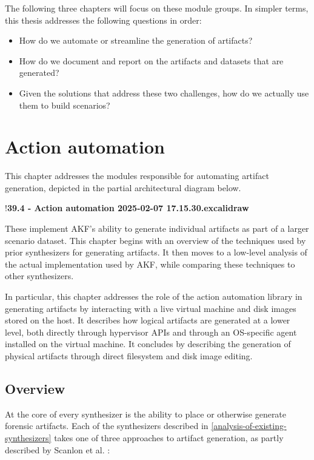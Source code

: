 \documentclass[letterpaper,12pt]{report}
\def\tightlist{}
\begin{document}
The following three chapters will focus on these module groups. In
simpler terms, this thesis addresses the following questions in order:

\begin{itemize}
\tightlist
\item
  How do we automate or streamline the generation of artifacts?
\item
  How do we document and report on the artifacts and datasets that are
  generated?
\item
  Given the solutions that address these two challenges, how do we
  actually use them to build scenarios?
\end{itemize}

\chapter{Action automation}\label{chapter-four}

This chapter addresses the modules responsible for automating artifact
generation, depicted in the partial architectural diagram below.

!\textbf{39.4 - Action automation 2025-02-07 17.15.30.excalidraw}

These implement AKF's ability to generate individual artifacts as part
of a larger scenario dataset. This chapter begins with an overview of
the techniques used by prior synthesizers for generating artifacts. It
then moves to a low-level analysis of the actual implementation used by
AKF, while comparing these techniques to other synthesizers.

In particular, this chapter addresses the role of the action automation
library in generating artifacts by interacting with a live virtual
machine and disk images stored on the host. It describes how logical
artifacts are generated at a lower level, both directly through
hypervisor APIs and through an OS-specific agent installed on the
virtual machine. It concludes by describing the generation of physical
artifacts through direct filesystem and disk image editing.

\section{Overview}\label{overview}

At the core of every synthesizer is the ability to place or otherwise
generate forensic artifacts. Each of the synthesizers described in
\autoref{analysis-of-existing-synthesizers} takes one of three approaches to artifact generation, as
partly described by Scanlon et al.
\cite{scanlonEviPlantEfficientDigital2017}:
\end{document}

